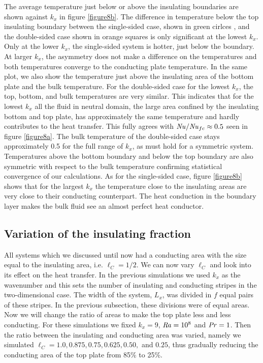 \documentclass{jfm}
\newcommand\Pran{\mbox{\textit{Pr}}} %
\newcommand\Ray{\mbox{\textit{Ra}}}  %
\newcommand\Nus{\mbox{\textit{Nu}}}  %
\begin{document}
The average temperature just below or above the insulating boundaries are
shown against $k_x$ in figure \ref{figure8b}.  The difference in temperature
below the top insulating boundary between the single-sided case, shown in
green cirlces , and the double-sided case shown in orange squares is only
significant at the lowest $k_x$.  Only at the lower $k_x$, the single-sided
system is hotter, just below the boundary.  At larger $k_x$, the asymmetry
does not make a difference on the temperatures and both temperatures converge
to the conducting plate temperature.  In the same plot, we also show the
temperature just above the insulating area of the bottom plate and the bulk
temperature.  For the double-sided case for the lowest $k_x$, the top, bottom,
and bulk temperatures are very similar.  This indicates that for the lowest
$k_x$ all the fluid in neutral domain, the large area confined by the
insulating bottom and top plate, has approximately the same temperature and
hardly contributes to the heat transfer.  This fully agrees with
$\Nus/\Nus_{fc}\approx 0.5$ seen in figure \ref{figure8a}.  The bulk
temperature of the double-sided case stays approximately 0.5 for the full
range of $k_x$, as must hold for a symmetric system.  Temperatures above the
bottom boundary and below the top boundary are also symmetric with respect to
the bulk temperature confirming statistical convergence of our calculations.
As for the single-sided case, figure \ref{figure8b} shows that for the largest
$k_x$ the temperature close to the insulating areas are very close to their
conducting counterpart.  The heat conduction in the boundary layer makes the
bulk fluid see an almost perfect heat conductor.

%
\subsection{Variation of the insulating fraction}\label{VariationFraction} All
systems which we discussed until now had a conducting area with the size equal
to the insulating area, i.e. $\ell_C = 1/2$.  We can now vary $\ell_C$ and
look into its effect on the heat transfer.  In the previous simulations we
used $k_x$ as the wavenumber and this sets the number of insulating and
conducting stripes in the two-dimensional case.  The width of the system,
$L_x$, was divided in $f$ equal pairs of these stripes.  In the previous
subsection, these divisions were of equal areas.  Now we will change the ratio
of areas to make the top plate less and less conducting.  For these
simulations we fixed $k_x = 9$, $\Ray=10^8$ and $\Pran=1$.  Then the ratio
between the insulating and conducting area was varied, namely we simulated
$\ell_C = 1.0, 0.875, 0.75, 0.625, 0.50,$ and $0.25$, thus gradually reducing
the conducting area of the top plate from 85\% to 25\%.
\end{document}
